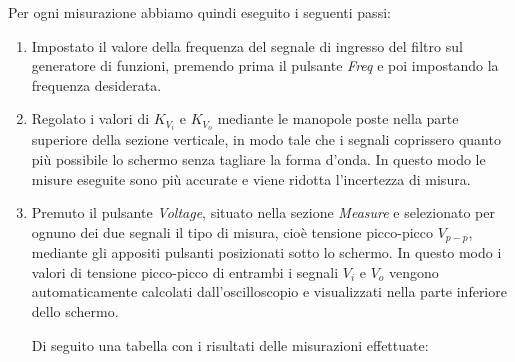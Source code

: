 Per ogni misurazione abbiamo quindi eseguito i seguenti passi:
\begin{enumerate}
    \item Impostato il valore della frequenza del segnale di ingresso del filtro  sul generatore di funzioni, premendo prima il pulsante \emph{Freq} e poi impostando la frequenza desiderata.
    \item Regolato i valori di $K_{V_i}$ e $K_{V_o}$ mediante le manopole poste nella parte superiore della sezione verticale, in modo tale che i segnali coprissero quanto più possibile lo schermo senza tagliare la forma d'onda. In questo modo le misure eseguite sono più accurate e viene ridotta l'incertezza di misura.
    \item Premuto il pulsante \emph{Voltage}, situato nella sezione \emph{Measure} e selezionato per ognuno dei due segnali il tipo di misura, cioè tensione picco-picco $V_{p-p}$, mediante gli appositi pulsanti posizionati sotto lo schermo.
    In questo modo i valori di tensione picco-picco di entrambi i segnali $V_i$ e $V_o$ vengono automaticamente calcolati dall'oscilloscopio e visualizzati nella parte inferiore dello schermo.

Di seguito una tabella con i risultati delle misurazioni effettuate:
    
\end{enumerate}
